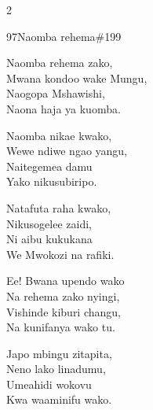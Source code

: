 \begin{multicols}{2}
\begin{hymn}{97}{Naomba rehema}{\#199}
\begin{stanza}
Naomba rehema zako,\\
Mwana kondoo wake Mungu,\\
Naogopa Mshawishi,\\
Naona haja ya kuomba.
\end{stanza}
\begin{stanza}
Naomba nikae kwako,\\
Wewe ndiwe ngao yangu,\\
Naitegemea damu\\
Yako nikusubiripo.
\end{stanza}
\begin{stanza}
Natafuta raha kwako,\\
Nikusogelee zaidi,\\
Ni aibu kukukana\\
We Mwokozi na rafiki.
\end{stanza}
\begin{stanza}
Ee! Bwana upendo wako\\
Na rehema zako nyingi,\\
Vishinde kiburi changu,\\
Na kunifanya wako tu.
\end{stanza}
\begin{stanza}
Japo mbingu zitapita,\\
Neno lako linadumu,\\
Umeahidi wokovu\\
Kwa waaminifu wako.
\end{stanza}
\end{hymn}


\end{multicols}
